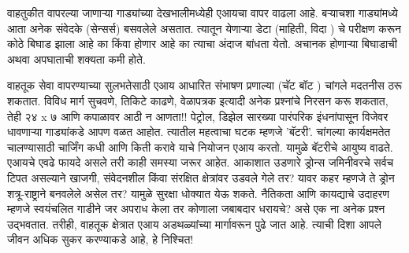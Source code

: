 वाहतुकीत वापरल्या जाणाऱ्या गाड्यांच्या देखभालीमध्येही एआयचा वापर वाढला आहे. बऱ्याचशा गाड्यांमध्ये आता अनेक संवेदके (सेन्सर्स) बसवलेले असतात. त्यातून येणाऱ्या डेटा (माहिती, विदा ) चे परीक्षण करून कोठे बिघाड झाला आहे का किंवा होणार आहे का त्याचा अंदाज बांधता येतो. अचानक होणाऱ्या बिघाडाची अथवा अपघाताची शक्यता कमी होते.

वाहतूक सेवा वापरण्याच्या सुलभतेसाठी एआय आधारित संभाषण प्रणाल्या (चॅट बॉट ) चांगले मदतनीस ठरू शकतात. विविध मार्ग सुचवणे, तिकिटे काढणे, वेळापत्रक इत्यादी अनेक प्रश्नांचे निरसन करू शकतात, तेही २४ x ७ आणि कपाळावर आठी न आणता!! पेट्रोल, डिझेल सारख्या पारंपरिक इंधनांपासून विजेवर धावणाऱ्या गाड्यांकडे आपण वळत आहोत. त्यातील महत्वाचा घटक म्हणजे 'बॅटरी'. चांगल्या कार्यक्षमतेत चालण्यासाठी चार्जिंग कधी आणि किती करावे याचे नियोजन एआय करतो. यामुळे बॅटरीचे आयुष्य वाढते. एआयचे एवढे फायदे असले तरी काही समस्या जरूर आहेत. आकाशात उडणारे ड्रोन्स जमिनीवरचे सर्वच टिपत असल्याने खाजगी, संवेदनशील किंवा संरक्षित क्षेत्रांवर उडवले गेले तर? यावर कहर म्हणजे ते ड्रोन शत्रू-राष्ट्राने बनवलेले असेल तर? यामुळे सुरक्षा धोक्यात येऊ शकते. नैतिकता आणि कायद्याचे उदाहरण म्हणजे स्वयंचलित गाडीने जर अपराध केला तर कोणाला जबाबदार धरायचे? असे एक ना अनेक प्रश्न उद्भवतात. तरीही, वाहतूक क्षेत्रात एआय अडथळ्यांच्या मार्गावरून पुढे जात आहे. त्याची दिशा आपले जीवन अधिक सुकर करण्याकडे आहे, हे निश्चित!